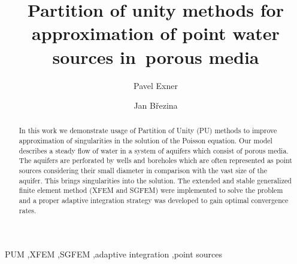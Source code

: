 \documentclass[preprint,12pt]{elsarticle}
\begin{document}
\begin{frontmatter}



\title{Partition of unity methods for approximation of point water sources in~porous media}


\author[adr]{Pavel Exner}

\author[adr]{Jan B{\v r}ezina}

\address[adr]{Technical University of Liberec, Studentsk{\' a} 1402/2, 461 17 Liberec 1, Czech Republic}


\begin{abstract}
In this work we demonstrate usage of Partition of Unity (PU) methods to improve approximation of singularities 
in the solution of the Poisson equation. Our model describes a steady flow of water in a system of aquifers
which consist of porous media. The aquifers are perforated by wells and boreholes which are often represented
as point sources considering their small diameter in comparison with the vast size of the aquifer. This 
brings singularities into the solution. The extended and stable generalized finite element method 
(XFEM and SGFEM) were implemented to solve the problem and a proper adaptive integration strategy was 
developed to gain optimal convergence rates.
\end{abstract}

\begin{keyword}
PUM \sep XFEM \sep SGFEM \sep adaptive integration \sep point sources



\end{keyword}

\end{frontmatter}
\end{document}
